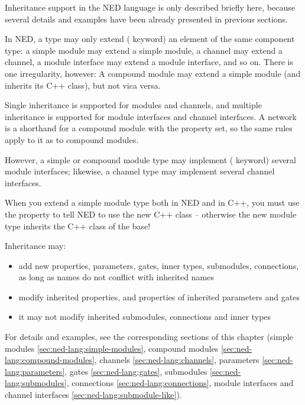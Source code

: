 Inheritance support in the NED language is only described briefly here,
because several details and examples have been already presented in
previous sections.

In NED, a type may only extend ( keyword) an element of
the same component type: a simple module may extend a simple module, a
channel may extend a channel, a module interface may extend a module
interface, and so on. There is one irregularity, however: A compound module
may extend a simple module (and inherits its C++ class), but not vica
versa.

Single inheritance is supported for modules and channels, and multiple inheritance
is supported for module interfaces and channel interfaces. A network is a
shorthand for a compound module with the  property set, so
the same rules apply to it as to compound modules.

However, a simple or compound module type may implement (
keyword) several module interfaces; likewise, a channel type may implement
several channel interfaces.

\begin{important}
    When you extend a simple module type both in NED and in C++, you must
    use the  property to tell NED to use the new C++ class --
    otherwise the new module type inherits the C++ class of the base!
\end{important}

Inheritance may:
\begin{itemize}
    \item add new properties, parameters, gates, inner types, submodules,
          connections, as long as names do not conflict with inherited names
    \item modify inherited properties, and properties of inherited parameters and
          gates
    \item it may not modify inherited submodules, connections and inner types
\end{itemize}

For details and examples, see the corresponding sections of this chapter
(simple modules \ref{sec:ned-lang:simple-modules},
compound modules \ref{sec:ned-lang:compound-modules},
channels \ref{sec:ned-lang:channels},
parameters \ref{sec:ned-lang:parameters},
gates \ref{sec:ned-lang:gates},
submodules \ref{sec:ned-lang:submodules},
connections \ref{sec:ned-lang:connections},
module interfaces and channel interfaces \ref{sec:ned-lang:submodule-like}).



